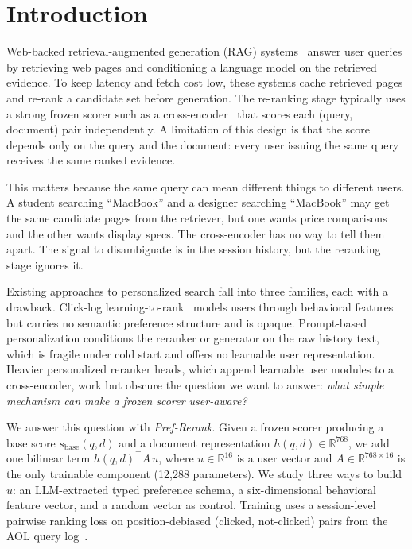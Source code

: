 \section{Introduction}
\label{sec:intro}

Web-backed retrieval-augmented generation (RAG) systems~\cite{lewis2020rag,sun2024ragsurvey} answer user queries by retrieving web pages and conditioning a language model on the retrieved evidence. To keep latency and fetch cost low, these systems cache retrieved pages and re-rank a candidate set before generation. The re-ranking stage typically uses a strong frozen scorer such as a cross-encoder~\cite{nogueira2020monot5,qin2023llmrerank} that scores each (query, document) pair independently. A limitation of this design is that the score depends only on the query and the document: every user issuing the same query receives the same ranked evidence.

This matters because the same query can mean different things to different users. A student searching ``MacBook'' and a designer searching ``MacBook'' may get the same candidate pages from the retriever, but one wants price comparisons and the other wants display specs. The cross-encoder has no way to tell them apart. The signal to disambiguate is in the session history, but the reranking stage ignores it.

Existing approaches to personalized search fall into three families, each with a drawback. Click-log learning-to-rank~\cite{craswell2007click,joachims2007evaluating} models users through behavioral features but carries no semantic preference structure and is opaque. Prompt-based personalization conditions the reranker or generator on the raw history text, which is fragile under cold start and offers no learnable user representation. Heavier personalized reranker heads, which append learnable user modules to a cross-encoder, work but obscure the question we want to answer: \emph{what simple mechanism can make a frozen scorer user-aware?}

We answer this question with \emph{Pref-Rerank}. Given a frozen scorer producing a base score $s_{\mathrm{base}}(q,d)$ and a document representation $h(q,d)\in\mathbb{R}^{768}$, we add one bilinear term $h(q,d)^\top A\, u$, where $u\in\mathbb{R}^{16}$ is a user vector and $A\in\mathbb{R}^{768\times 16}$ is the only trainable component (12{,}288 parameters). We study three ways to build $u$: an LLM-extracted typed preference schema, a six-dimensional behavioral feature vector, and a random vector as control. Training uses a session-level pairwise ranking loss on position-debiased (clicked, not-clicked) pairs from the AOL query log~\cite{pass2006_picture}.

